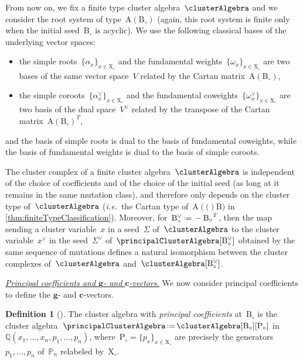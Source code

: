 \documentclass{amsart}
\theoremstyle{definition}
\newtheorem{definition}[theorem]{Definition}
\newcommand{\Q}{\mathbb{Q}} %
\renewcommand{\b}[1]{{\boldsymbol{#1}}} %
\newcommand{\eqdef}{\mbox{\,\raisebox{0.2ex}{\scriptsize\ensuremath{\mathrm:}}\ensuremath{=}\,}} %
\newcommand{\transpose}[1]{{#1}^T} %
\newcommand{\ie}{\textit{i.e.}~} %
\newcommand{\darkblue}{\color{darkblue}} %
\newcommand{\defn}[1]{\textsl{\darkblue #1}} %
\newcommand{\para}[1]{\medskip\noindent\uline{\textit{#1.}}} %
\newcommand{\Trop}[1]{\mathbb{P}_{#1}} %
\newcommand{\seed}{\Sigma} %
\newcommand{\cluster}{\mathrm{X}} %
\newcommand{\coefficients}{\mathrm{P}} %
\newcommand{\B}{\mathrm{B}} %
\newcommand{\A}[1]{\mathrm{A}({#1})} %
\newcommand{\simpleRoot}{\alpha} %
\newcommand{\fundamentalWeight}{\omega} %
\begin{document}
From now on, we fix a finite type cluster algebra~$\clusterAlgebra$ and we consider the root system of type~$\A{\B_\circ}$ (again, this root system is finite only when the initial seed~$\B_\circ$ is acyclic). We use the following classical bases of the underlying vector spaces:
\begin{itemize}
\item the simple roots~$\{\simpleRoot_x\}_{x \in \cluster_\circ}$ and the fundamental weights~$\{\fundamentalWeight_x\}_{x \in \cluster_\circ}$ are two bases of the same vector space~$V$ related by the Cartan matrix~$\A{\B_\circ}$,
\item the simple coroots~$\{\simpleRoot^\vee_x\}_{x \in \cluster_\circ}$ and the fundamental coweights~$\{\fundamentalWeight^\vee_x\}_{x \in \cluster_\circ}$ are two basis of the dual space~$V^\vee$ related by the transpose of the Cartan matrix~$\transpose{\A{\B_\circ}}$,
\end{itemize}
and the basis of simple roots is dual to the basis of fundamental coweights, while the basis of fundamental weights is dual to the basis of simple coroots.

The cluster complex of a finite cluster algebra~$\clusterAlgebra$ is independent of the choice of coefficients and of the choice of the initial seed (as long at it remains in the same mutation class), and therefore only depends on the cluster type of~$\clusterAlgebra$ (\ie the Cartan type of~$\A(\B)$ in \cref{thm:finiteTypeClassification}).
Moreover, for~$\B_\circ^\vee \eqdef -\transpose{\B_\circ}$, then the map sending a cluster variable~$x$ in a seed~$\seed$ of~$\clusterAlgebra$ to the cluster variable~$x^\vee$ in the seed~$\seed^\vee$ of~$\principalClusterAlgebra[\B_\circ^\vee]$ obtained by the same sequence of mutations defines a natural isomorphism between the cluster complexes of~$\clusterAlgebra$ and~$\clusterAlgebra[\B_\circ^\vee]$.

\para{Principal coefficients and $\b{g}$- and $\b{c}$-vectors}
%
We now consider principal coefficients to define the $\b{g}$- and $\b{c}$-vectors.

\begin{definition}[{\cite[Def.~3.1]{FominZelevinsky-ClusterAlgebrasIV}}]
The cluster algebra with \defn{principal coefficients} at~$\B_\circ$ is the cluster algebra~$\principalClusterAlgebra \eqdef \clusterAlgebra[\B_\circ][\coefficients_\circ]$ in~$\Q(x_1, \dots, x_n, p_1, \dots, p_n)$, where~$\coefficients_\circ = \{p_x\}_{x \in \cluster_\circ}$ are precisely the generators~$p_1, \dots, p_n$ of~$\Trop{n}$ relabeled by~$\cluster_\circ$.
\end{definition}
\end{document}
